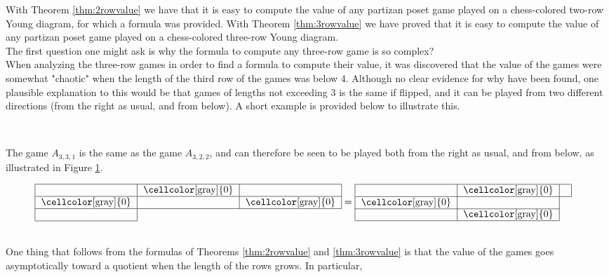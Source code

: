With Theorem \ref{thm:2rowvalue} we have that it is easy to compute the value of any partizan poset game played on a chess-colored two-row Young diagram, for which a formula was provided. With Theorem \ref{thm:3rowvalue} we have proved that it is easy to compute the value of any partizan poset game played on a chess-colored three-row Young diagram. 
\\
The first question one might ask is why the formula to compute any three-row game is so complex? 
\\
When analyzing the three-row games in order to find a formula to compute their value, it was discovered that the value of the games were somewhat "chaotic" when the length of the third row of the games was below 4. Although no clear evidence for why have been found, one plausible explanation to this would be that games of lengths not exceeding 3 is the same if flipped, and it can be played from two different directions (from the right as usual, and from below). A short example is provided below to illustrate this.
\begin{ex}{}~\\
\begin{minipage}{0.4\textwidth}
The game $A_{3,3,1}$ is the same as the game $A_{3,2,2}$, and can therefore be seen to be played both from the right as usual, and from below, as illustrated in Figure \ref{fig:flipex}.
\end{minipage}
\begin{minipage}{0.6\textwidth}
\begin{figure}[H]
\centering
$\begin{tabular}{ | c | c | c |}
\hline
~&\cellcolor[gray]{0}&~\\
\hline
\cellcolor[gray]{0}&~&\cellcolor[gray]{0}\\
\hline
~\\
\cline{1-1}
\end{tabular}
=
\begin{tabular}{ | c | c | c |}
\hline
~&\cellcolor[gray]{0}&~\\
\hline
\cellcolor[gray]{0}&~\\
\cline{1-2}
~&\cellcolor[gray]{0}\\
\cline{1-2}
\end{tabular}
$
\label{fig:flipex}
\end{figure}
\end{minipage}
\end{ex}
~\\
One thing that follows from the formulas of Theorems \ref{thm:2rowvalue} and \ref{thm:3rowvalue} is that the value of the games goes asymptotically toward a quotient when the length of the rows grows. In particular,
